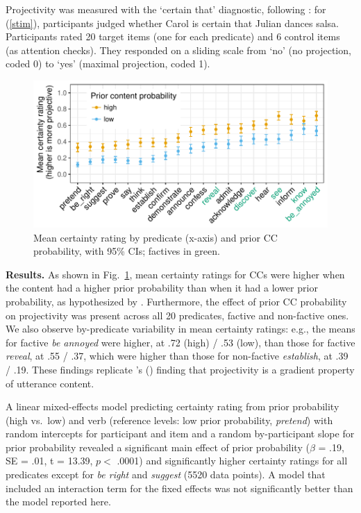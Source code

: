 \documentclass[12pt,fleqn]{article}
\newcommand{\citetpos}[1]{\citeauthor{#1}'s (\citeyear{#1})}
\newcommand{\6}{\mbox{$[\hspace*{-.6mm}[$}}
\newcommand{\9}{\mbox{$]\hspace*{-.6mm}]$}}
\begin{document}
\noindent Projectivity was measured with the `certain that' diagnostic, following \citealt{tbd-variability}: for (\ref{stim}), participants judged whether Carol is certain that Julian dances salsa. Participants rated 20 target items (one for each predicate) and 6 control items (as attention checks). They responded on a sliding scale from `no' (no projection, coded 0) to `yes' (maximal projection, coded 1).
\begin{figure}
\centering
\includegraphics[width=.45\paperwidth]{../results/3-projectivity/graphs/means-projectivity-by-predicate-and-facttype}
\caption{Mean certainty rating by predicate (x-axis) and prior CC probability, with 95\% CIs; factives in green.}\label{f-proj}
\end{figure}

\noindent
{\bf Results.} As shown in Fig.~\ref{f-proj}, mean certainty ratings for CCs were higher when the content had a higher prior probability than when it had a lower prior probability, as hypothesized by \citet{tbd-variability}. Furthermore, the effect of prior CC probability on projectivity was present across all 20 predicates, factive and non-factive ones. We also observe by-predicate variability in mean certainty ratings:  e.g., the means for factive {\em be annoyed} were higher, at .72 (high) / .53 (low), than those for factive {\em reveal}, at .55 / .37, which were higher than those for non-factive {\em establish}, at .39 / .19. These findings replicate \citetpos{tbd-variability} finding that projectivity is a gradient property of utterance content.

A linear mixed-effects model predicting certainty rating from prior probability (high vs.\ low) and verb (reference levels: low prior probability, {\em pretend}) with random intercepts for participant and item and a random by-participant slope for prior probability revealed a significant main effect of prior probability ($\beta$ = .19, SE = .01, t = 13.39, $p <$ .0001) and significantly higher certainty ratings for all predicates except for {\em be right} and {\em suggest} (5520 data points). A model that included an interaction term for the fixed effects was not significantly better than the model reported here.
\end{document}

